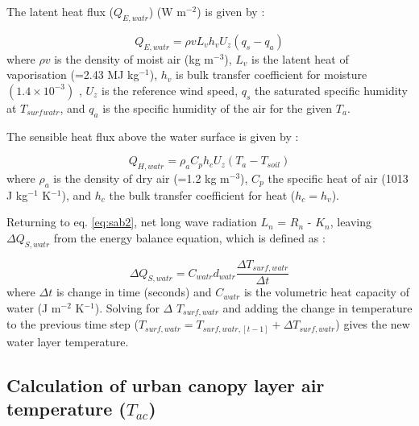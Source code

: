 \documentclass[journal abbreviation, manuscript]{copernicus}
\begin{document}
The latent heat flux (\ensuremath{Q_{E,watr}}) (W m$^{-2}$) is given by \cite{Arya2001}:

\begin{equation} 
\ensuremath{Q_{E,watr}} = \ensuremath{\rho v} \ensuremath{L_{v}} \ensuremath{h_{v}} \ensuremath{U_{z}} (\ensuremath{q_{s}} - \ensuremath{q_{a}})
\label{eq:lewtr} \end{equation} where \ensuremath{\rho v} is the density of moist air (kg m$^{-3}$), \ensuremath{L_{v}} is the latent heat of vaporisation (=2.43 MJ kg$^{-1}$), \ensuremath{h_{v}} is bulk transfer coefficient for moisture $(1.4\times10^{-3})$ \citep{Hicks1972,Jones2005}, \ensuremath{U_{z}} is the reference wind speed, \ensuremath{q_{s}} the saturated specific humidity at $T_{surf}$$_{watr}$, and \ensuremath{q_{a}} is the specific humidity of the air for the given \ensuremath{T_{a}}. 

The sensible heat flux above the water surface is given by \cite{MolinaMartinez2006}:


\begin{equation} 
Q_{H,watr} = \ensuremath{\rho_{a}} \ensuremath{C_{p}} \ensuremath{h_{c}} \ensuremath{U_{z}} (\ensuremath{T_{a}}-\ensuremath{T_{soil}})
\label{eq:hwtr} \end{equation} where \ensuremath{\rho_{a}} is the density of dry air (=1.2 kg m$^{-3}$), \ensuremath{C_{p}} the specific heat of air (1013 J kg$^{-1}$ K$^{-1}$), and \ensuremath{h_{c}} the bulk transfer coefficient for heat ($h_{c} = h_{v}$). 

Returning to eq. \ref{eq:sab2}, net long wave radiation \ensuremath{L_{n}} = \ensuremath{R_{n}} - \ensuremath{K_{n}}, leaving $\ensuremath{\Delta Q_{S,watr}}$ from the energy balance equation, which is defined as \citep{MolinaMartinez2006}:

\begin{equation} 
\ensuremath{\Delta Q_{S,watr}} = \ensuremath{C_{watr}} \ensuremath{d_{watr}} \frac{\Delta T_{surf,watr}}{\Delta t}
\label{eq:swrt} \end{equation} where $\Delta t$ is change in time (seconds) and \ensuremath{C_{watr}} is the volumetric heat capacity of water (J m$^{-2}$ K$^{-1}$). Solving for $\Delta$ $T_{surf,watr}$ and adding the change in temperature to the previous time step ($T_{surf,watr} = T_{surf,watr,[t-1]}  + \Delta T_{surf,watr}$) gives the new water layer temperature. 




\subsection{Calculation of urban canopy layer air temperature ($T_{ac}$) }\label{sec:calcTac}
\end{document}
